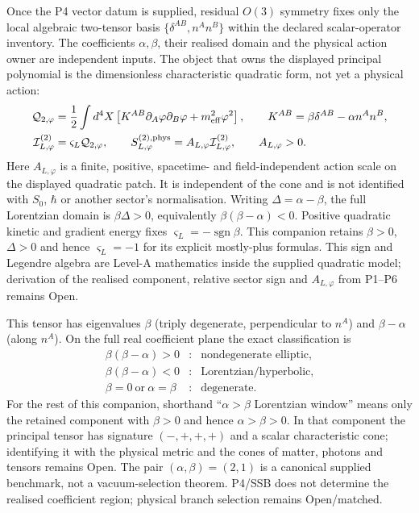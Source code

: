 \documentclass[11pt,a4paper]{article}
\begin{document}
Once the P4 vector datum is supplied, residual $O(3)$ symmetry fixes only the local algebraic two-tensor basis $\{\delta^{AB},n^An^B\}$ within the declared scalar-operator inventory.  The coefficients $\alpha,\beta$, their realised domain and the physical action owner are independent inputs.  The object that owns the displayed principal polynomial is the dimensionless characteristic quadratic form, not yet a physical action:
\begin{align}
  \mathcal Q_{2,\varphi}
  &= \frac12\int d^4X\left[
     K^{AB}\partial_A\varphi\partial_B\varphi
     +m_{\rm eff}^2\varphi^2\right],
  \qquad K^{AB}=\beta\delta^{AB}-\alpha n^An^B,
  \label{eq:pop_eft}\\
  \mathcal I_{L,\varphi}^{(2)}
  &=\varsigma_L\mathcal Q_{2,\varphi},
  \qquad
  S_{L,\varphi}^{{(2)},\rm phys}
  =A_{L,\varphi}\mathcal I_{L,\varphi}^{(2)},
  \qquad A_{L,\varphi}>0 .
\end{align}
Here $A_{L,\varphi}$ is a finite, positive, spacetime- and field-independent action scale on the displayed quadratic patch.  It is independent of the cone and is not identified with $S_0$, $\hbar$ or another sector's normalisation.  Writing $\Delta=\alpha-\beta$, the full Lorentzian domain is $\beta\Delta>0$, equivalently $\beta(\beta-\alpha)<0$.  Positive quadratic kinetic and gradient energy fixes $\varsigma_L=-\operatorname{sgn}\beta$.  This companion retains $\beta>0$, $\Delta>0$ and hence $\varsigma_L=-1$ for its explicit mostly-plus formulas.  This sign and Legendre algebra are Level-A mathematics inside the supplied quadratic model; derivation of the realised component, relative sector sign and $A_{L,\varphi}$ from P1--P6 remains Open.

This tensor has eigenvalues $\beta$ (triply degenerate, perpendicular to
$n^A$) and $\beta-\alpha$ (along $n^A$).  On the full real coefficient
plane the exact classification is
\[
 \begin{array}{ccl}
 \beta(\beta-\alpha)>0 &:& \text{nondegenerate elliptic},\\
 \beta(\beta-\alpha)<0 &:& \text{Lorentzian/hyperbolic},\\
 \beta=0\ \text{or}\ \alpha=\beta &:& \text{degenerate}.
 \end{array}
\]
For the rest of this companion, shorthand ``$\alpha>\beta$ Lorentzian
window'' means only the retained component with
$\beta>0$ and hence $\alpha>\beta>0$.  In that component the principal tensor
has signature $(-,+,+,+)$ and a scalar characteristic cone; identifying it
with the physical metric and the cones of matter, photons and tensors remains
Open.  The pair $(\alpha,\beta)=(2,1)$ is a canonical supplied benchmark,
not a vacuum-selection theorem. P4/SSB does not determine the realised
coefficient region; physical branch selection remains Open/matched.
\end{document}
